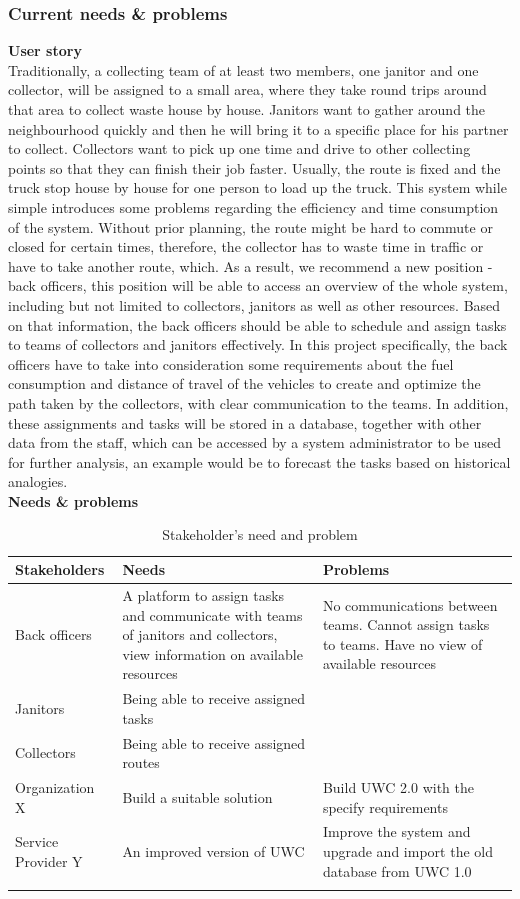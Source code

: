 \documentclass[a4paper, 13pt]{article}
\begin{document}
\subsubsection{Current needs \& problems}
\textbf{User story} \\
Traditionally, a collecting team of at least two members, one janitor and one collector, will be assigned to a small area, where they take round trips around that area to collect waste house by house. Janitors want to gather around the neighbourhood quickly and then he will bring it to a specific place for his partner to collect. Collectors want to pick up one time and drive to other collecting points so that they can finish their job faster. Usually, the route is fixed and the truck stop house by house for one person to load up the truck. This system while simple introduces some problems regarding the efficiency and time consumption of the system. Without prior planning, the route might be hard to commute or closed for certain times, therefore, the collector has to waste time in traffic or have to take another route, which. As a result, we recommend a new position - back officers, this position will be able to access an overview of the whole system, including but not limited to collectors, janitors as well as other resources. Based on that information, the back officers should be able to schedule and assign tasks to teams of collectors and janitors effectively. In this project specifically, the back officers have to take into consideration some requirements about the fuel consumption and distance of travel of the vehicles to create and optimize the path taken by the collectors, with clear communication to the teams. In addition, these assignments and tasks will be stored in a database, together with other data from the staff, which can be accessed by a system administrator to be used for further analysis, an example would be to forecast the tasks based on historical analogies.\\
\newpage
\textbf{Needs \& problems}

\begin{longtable}{|p{}|p{}|p{}|} 
\hline
    \textbf{Stakeholders} & \textbf{Needs} & \textbf{Problems} \\

\hline
Back officers & A platform to assign tasks and communicate with teams of janitors and collectors, view information on available resources & No communications between teams. Cannot assign tasks to teams. Have no view of available resources\\
\hline
Janitors & Being able to receive assigned tasks  &  \\
\hline 
Collectors & Being able to receive assigned routes & \\
\hline 
Organization X & Build a suitable solution & Build UWC 2.0 with the specify requirements \\
\hline 
Service Provider Y & An improved version of UWC & Improve the system and upgrade and import the old database from UWC 1.0\\
\hline 
    \caption{Stakeholder's need and problem}
\end{longtable}
\end{document}
